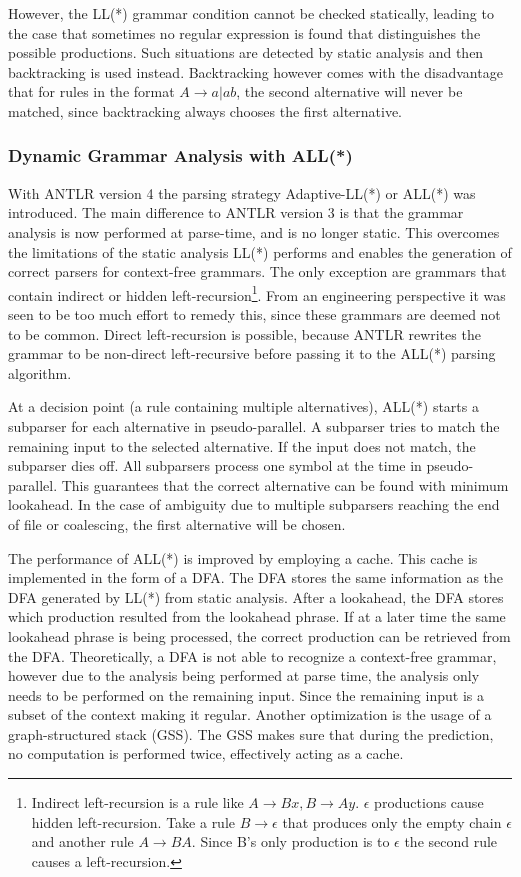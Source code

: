 However, the LL(*) grammar condition cannot be checked statically, leading to the case that sometimes no regular expression is found that distinguishes the possible productions. Such situations are detected by static analysis and then backtracking is used instead. Backtracking however comes with the disadvantage that for rules in the format $A \rightarrow a | a b$, the second alternative will never be matched, since backtracking always chooses the first alternative. 

\subsubsection{Dynamic Grammar Analysis with ALL(*)}

With ANTLR version 4 the parsing strategy Adaptive-LL(*) or ALL(*) was introduced. The main difference to ANTLR version 3 is that the grammar analysis is now performed at parse-time, and is no longer static. This overcomes the limitations of the static analysis LL(*) performs and enables the generation of correct parsers for context-free grammars. The only exception are grammars that contain indirect or hidden left-recursion\footnote{Indirect left-recursion is a rule like $A \rightarrow Bx, B \rightarrow Ay$. $\epsilon$ productions cause hidden left-recursion. Take a rule $B \rightarrow \epsilon$ that produces only the empty chain $\epsilon$ and another rule $A \rightarrow BA$. Since B's only production is to $\epsilon$ the second rule causes a left-recursion. }. From an engineering perspective it was seen to be too much effort to remedy this, since these grammars are deemed not to be common. Direct left-recursion is possible, because ANTLR rewrites the grammar to be non-direct left-recursive before passing it to the ALL(*) parsing algorithm. 

At a decision point (a rule containing multiple alternatives), ALL(*) starts a subparser for each alternative in pseudo-parallel. A subparser tries to match the remaining input to the selected alternative. If the input does not match, the subparser dies off. All subparsers process one symbol at the time in pseudo-parallel. This guarantees that the correct alternative can be found with minimum lookahead. In the case of ambiguity due to multiple subparsers reaching the end of file or coalescing, the first alternative will be chosen. 

The performance of ALL(*) is improved by employing a cache. This cache is implemented in the form of a DFA. The DFA stores the same information as the DFA generated by LL(*) from static analysis. After a lookahead, the DFA stores which production resulted from the lookahead phrase. If at a later time the same lookahead phrase is being processed, the correct production can be retrieved from the DFA. Theoretically, a DFA is not able to recognize a context-free grammar, however due to the analysis being performed at parse time, the analysis only needs to be performed on the remaining input. Since the remaining input is a subset of the context making it regular. Another optimization is the usage of a graph-structured stack (GSS). The GSS makes sure that during the prediction, no computation is performed twice, effectively acting as a cache. 

